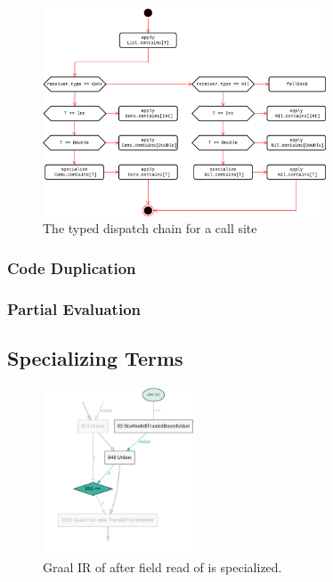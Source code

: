 \begin{figure}[H]
	\centering
	\includegraphics[width=0.75\textwidth]{figures/tastytruffle-type-dispatch-chain.png}
	\caption{The typed dispatch chain for a  call site }
\end{figure}

\subsubsection*{Code Duplication}

\subsubsection*{Partial Evaluation}

\subsection{Specializing Terms}

\begin{figure}[!htb]
	\centering
	\includegraphics[width=0.4\textwidth]{figures/dot/List.contains.boxed-param-read.TruffleTier.png}
	\caption{Graal IR of  after field read of  is specialized.}
	\label{graalir:cons-contains-param-read}
\end{figure}


